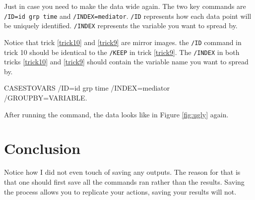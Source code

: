 \documentclass[
]{book}
\newenvironment{Shaded}{\begin{snugshade}}{\end{snugshade}}
\newcommand{\NormalTok}[1]{#1}
\newcommand{\OtherTok}[1]{\textcolor[rgb]{0.56,0.35,0.01}{#1}}
\newcommand{\SpecialCharTok}[1]{\textcolor[rgb]{0.00,0.00,0.00}{#1}}
\begin{document}
Just in case you need to make the data wide again. The two key commands are \texttt{/ID=id\ grp\ time} and \texttt{/INDEX=mediator}. \texttt{/ID} represents how each data point will be uniquely identified. \texttt{/INDEX} represents the variable you want to spread by.

Notice that trick \ref{trick10} and \ref{trick9} are mirror images. the \texttt{/ID} command in trick 10 should be identical to the \texttt{/KEEP} in trick \ref{trick9}. The \texttt{/INDEX} in both tricks \ref{trick10} and \ref{trick9} should contain the variable name you want to spread by.

\begin{Shaded}
\begin{Highlighting}[]
\NormalTok{CASESTOVARS}
  \SpecialCharTok{/}\NormalTok{ID}\OtherTok{=}\NormalTok{id grp time}
  \SpecialCharTok{/}\NormalTok{INDEX}\OtherTok{=}\NormalTok{mediator}
  \SpecialCharTok{/}\NormalTok{GROUPBY}\OtherTok{=}\NormalTok{VARIABLE.}
\end{Highlighting}
\end{Shaded}

After running the command, the data looks like in Figure \ref{fig:ugly} again.

\hypertarget{conclusion}{%
\chapter{Conclusion}\label{conclusion}}

Notice how I did not even touch of saving any outputs. The reason for that is that one should first save all the commands ran rather than the results. Saving the process allows you to replicate your actions, saving your results will not.

  
\end{document}
